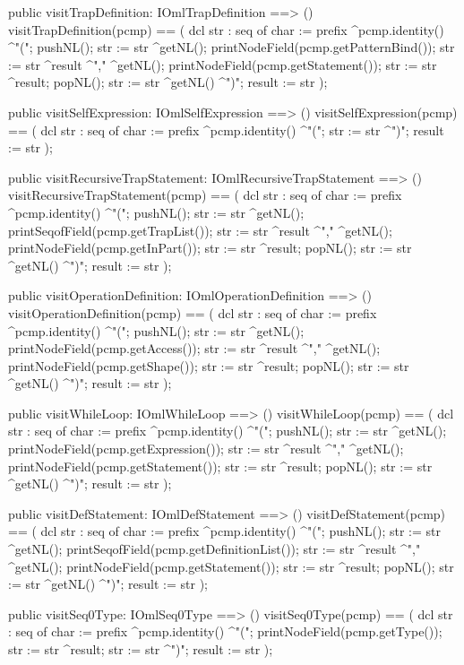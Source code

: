 \begin{vdm_al}
  public visitTrapDefinition: IOmlTrapDefinition ==> ()
  visitTrapDefinition(pcmp) ==
    ( dcl str : seq of char := prefix ^pcmp.identity() ^"(";
      pushNL();
      str := str ^getNL();
      printNodeField(pcmp.getPatternBind());
      str := str ^result ^"," ^getNL();
      printNodeField(pcmp.getStatement());
      str := str ^result;
      popNL();
      str := str ^getNL() ^")";
      result := str );

  public visitSelfExpression: IOmlSelfExpression ==> ()
  visitSelfExpression(pcmp) ==
    ( dcl str : seq of char := prefix ^pcmp.identity() ^"(";
      str := str ^")";
      result := str );

  public visitRecursiveTrapStatement: IOmlRecursiveTrapStatement ==> ()
  visitRecursiveTrapStatement(pcmp) ==
    ( dcl str : seq of char := prefix ^pcmp.identity() ^"(";
      pushNL();
      str := str ^getNL();
      printSeqofField(pcmp.getTrapList());
      str := str ^result ^"," ^getNL();
      printNodeField(pcmp.getInPart());
      str := str ^result;
      popNL();
      str := str ^getNL() ^")";
      result := str );

  public visitOperationDefinition: IOmlOperationDefinition ==> ()
  visitOperationDefinition(pcmp) ==
    ( dcl str : seq of char := prefix ^pcmp.identity() ^"(";
      pushNL();
      str := str ^getNL();
      printNodeField(pcmp.getAccess());
      str := str ^result ^"," ^getNL();
      printNodeField(pcmp.getShape());
      str := str ^result;
      popNL();
      str := str ^getNL() ^")";
      result := str );

  public visitWhileLoop: IOmlWhileLoop ==> ()
  visitWhileLoop(pcmp) ==
    ( dcl str : seq of char := prefix ^pcmp.identity() ^"(";
      pushNL();
      str := str ^getNL();
      printNodeField(pcmp.getExpression());
      str := str ^result ^"," ^getNL();
      printNodeField(pcmp.getStatement());
      str := str ^result;
      popNL();
      str := str ^getNL() ^")";
      result := str );

  public visitDefStatement: IOmlDefStatement ==> ()
  visitDefStatement(pcmp) ==
    ( dcl str : seq of char := prefix ^pcmp.identity() ^"(";
      pushNL();
      str := str ^getNL();
      printSeqofField(pcmp.getDefinitionList());
      str := str ^result ^"," ^getNL();
      printNodeField(pcmp.getStatement());
      str := str ^result;
      popNL();
      str := str ^getNL() ^")";
      result := str );

  public visitSeq0Type: IOmlSeq0Type ==> ()
  visitSeq0Type(pcmp) ==
    ( dcl str : seq of char := prefix ^pcmp.identity() ^"(";
      printNodeField(pcmp.getType());
      str := str ^result;
      str := str ^")";
      result := str );


\end{vdm_al}
